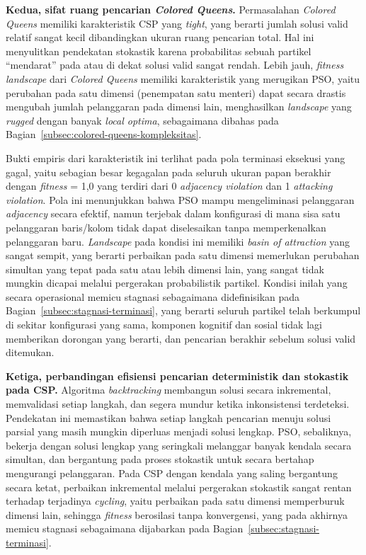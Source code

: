 \textbf{Kedua, sifat ruang pencarian \textit{Colored Queens}.} Permasalahan \textit{Colored Queens} memiliki karakteristik CSP yang \textit{tight}, yang berarti jumlah solusi valid relatif sangat kecil dibandingkan ukuran ruang pencarian total. Hal ini menyulitkan pendekatan stokastik karena probabilitas sebuah partikel ``mendarat'' pada atau di dekat solusi valid sangat rendah. Lebih jauh, \textit{fitness landscape} dari \textit{Colored Queens} memiliki karakteristik yang merugikan PSO, yaitu perubahan pada satu dimensi (penempatan satu menteri) dapat secara drastis mengubah jumlah pelanggaran pada dimensi lain, menghasilkan \textit{landscape} yang \textit{rugged} dengan banyak \textit{local optima}, sebagaimana dibahas pada Bagian~\ref{subsec:colored-queens-kompleksitas}.

Bukti empiris dari karakteristik ini terlihat pada pola terminasi eksekusi yang gagal, yaitu sebagian besar kegagalan pada seluruh ukuran papan berakhir dengan \textit{fitness} = 1,0 yang terdiri dari 0 \textit{adjacency violation} dan 1 \textit{attacking violation}. Pola ini menunjukkan bahwa PSO mampu mengeliminasi pelanggaran \textit{adjacency} secara efektif, namun terjebak dalam konfigurasi di mana sisa satu pelanggaran baris/kolom tidak dapat diselesaikan tanpa memperkenalkan pelanggaran baru. \textit{Landscape} pada kondisi ini memiliki \textit{basin of attraction} yang sangat sempit, yang berarti perbaikan pada satu dimensi memerlukan perubahan simultan yang tepat pada satu atau lebih dimensi lain, yang sangat tidak mungkin dicapai melalui pergerakan probabilistik partikel. Kondisi inilah yang secara operasional memicu stagnasi sebagaimana didefinisikan pada Bagian~\ref{subsec:stagnasi-terminasi}, yang berarti seluruh partikel telah berkumpul di sekitar konfigurasi yang sama, komponen kognitif dan sosial tidak lagi memberikan dorongan yang berarti, dan pencarian berakhir sebelum solusi valid ditemukan.

\textbf{Ketiga, perbandingan efisiensi pencarian deterministik dan stokastik pada CSP.} Algoritma \textit{backtracking} membangun solusi secara inkremental, memvalidasi setiap langkah, dan segera mundur ketika inkonsistensi terdeteksi. Pendekatan ini memastikan bahwa setiap langkah pencarian menuju solusi parsial yang masih mungkin diperluas menjadi solusi lengkap. PSO, sebaliknya, bekerja dengan solusi lengkap yang seringkali melanggar banyak kendala secara simultan, dan bergantung pada proses stokastik untuk secara bertahap mengurangi pelanggaran. Pada CSP dengan kendala yang saling bergantung secara ketat, perbaikan inkremental melalui pergerakan stokastik sangat rentan terhadap terjadinya \textit{cycling}, yaitu perbaikan pada satu dimensi memperburuk dimensi lain, sehingga \textit{fitness} berosilasi tanpa konvergensi, yang pada akhirnya memicu stagnasi sebagaimana dijabarkan pada Bagian~\ref{subsec:stagnasi-terminasi}.

